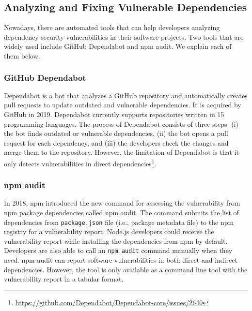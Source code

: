 \documentclass[conference]{IEEEtran}
\begin{document}
	\subsection{Analyzing and Fixing Vulnerable Dependencies}
	Nowadays, there are automated tools that can help developers analyzing dependency security vulnerabilities in their software projects. Two tools that are widely used include GitHub Dependabot and npm audit. We explain each of them below.
	
	\subsubsection{GitHub Dependabot}
	Dependabot is a bot that analyzes a GitHub repository and automatically creates pull requests to update outdated and vulnerable dependencies. It is acquired by GitHub in 2019.
	Dependabot currently supports repositories written in 15 programming languages.
	The process of Dependabot consists of three steps: (i) the bot finds outdated or vulnerable dependencies, (ii) the bot opens a pull request for each dependency, and (iii) the developers check the changes and merge them to the repository.
	However, the limitation of Dependabot is that it only detects vulnerabilities in direct dependencies\footnote{\url{https://github.com/Dependabot/Dependabot-core/issues/2640}}.
	
	\subsubsection{npm audit}
	In 2018, npm introduced the new command for assessing the vulnerability from npm package dependencies called npm audit.
	The command submits the list of dependencies from \texttt{package.json} file (i.e., package metadata file) to the npm registry for a vulnerability report.
	Node.js developers could receive the vulnerability report while installing the dependencies from npm by default.
	Developers are also able to call an \texttt{npm audit} command manually when they need. npm audit can report software vulnerabilities in both direct and indirect dependencies. 
	However, the tool is only available as a command line tool with the vulnerability report in a tabular format.
	
\end{document}
